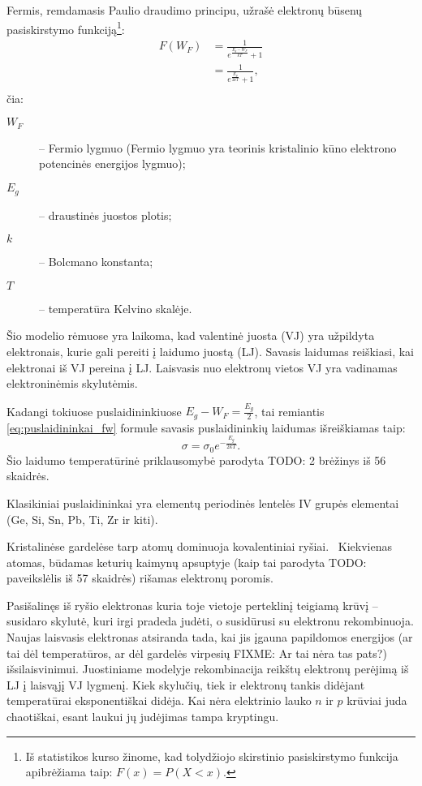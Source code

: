 Fermis, remdamasis Paulio draudimo principu, užrašė elektronų
būsenų pasiskirstymo funkciją\footnote{Iš statistikos kurso žinome,
kad tolydžiojo skirstinio pasiskirstymo funkcija apibrėžiama taip:
$F(x) = P(X < x)$.}:
\begin{align}
  F(W_{F})
  &= \frac{1}{e^{\frac{E_{g} - W_{F}}{kT}} + 1} \\
  &= \frac{1}{e^{\frac{E_{g}}{2kT}} + 1}, \label{eq:puslaidininkai_fw}\\
\end{align}
čia:
\begin{description}
  \item[$W_{F}$] – Fermio lygmuo (Fermio lygmuo yra teorinis
    kristalinio kūno elektrono potencinės energijos lygmuo);
  \item[$E_{g}$] – draustinės juostos plotis;
  \item[$k$] – Bolcmano konstanta;
  \item[$T$] – temperatūra Kelvino skalėje.
\end{description}
Šio modelio rėmuose yra laikoma, kad valentinė juosta (VJ) yra
užpildyta elektronais, kurie gali pereiti į laidumo juostą (LJ).
Savasis laidumas reiškiasi, kai elektronai iš VJ pereina į LJ.
Laisvasis nuo elektronų vietos VJ yra vadinamas elektroninėmis
skylutėmis.

Kadangi tokiuose puslaidininkiuose $E_{g} - W_{F} = \frac{E_{g}}{2}$,
tai remiantis \ref{eq:puslaidininkai_fw} formule savasis
puslaidininkių laidumas išreiškiamas taip:
\begin{equation*}
  \sigma = \sigma_{0} e^{-\frac{E_{g}}{2kT}}.
\end{equation*}
Šio laidumo temperatūrinė priklausomybė parodyta TODO: 2 brėžinys iš
56 skaidrės.

Klasikiniai puslaidininkai yra elementų periodinės lentelės IV grupės
elementai (Ge, Si, Sn, Pb, Ti, Zr ir kiti).

Kristalinėse gardelėse tarp atomų dominuoja kovalentiniai ryšiai. \
Kiekvienas atomas, būdamas keturių kaimynų apsuptyje (kaip tai parodyta
TODO: paveikslėlis iš 57 skaidrės) rišamas elektronų poromis.

Pasišalinęs iš ryšio elektronas kuria toje vietoje perteklinį teigiamą
krūvį – susidaro skylutė, kuri irgi pradeda judėti, o susidūrusi
su elektronu rekombinuoja. Naujas laisvasis elektronas atsiranda
tada, kai jis įgauna papildomos energijos (ar tai dėl temperatūros,
ar dėl gardelės virpesių FIXME: Ar tai nėra tas pats?) išsilaisvinimui.
Juostiniame modelyje rekombinacija reikštų elektronų perėjimą iš LJ
į laisvąjį VJ lygmenį. Kiek skylučių, tiek ir elektronų tankis
didėjant temperatūrai eksponentiškai didėja. Kai nėra elektrinio lauko
$n$ ir $p$ krūviai juda chaotiškai, esant laukui jų judėjimas tampa
kryptingu.

